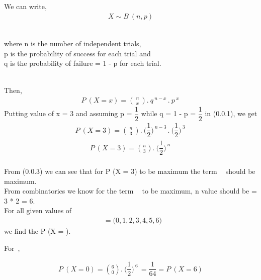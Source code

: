 \documentclass[journal,12pt,twocolumn]{IEEEtran}
\begin{document}
\subsection*{}\\
We can write,
\begin{align*}X \sim B\ (n, p)\end{align*}
\begin{flushalign}\\where n is the number of independent trials,\\ p is the probability of success for each trial and\\ q is the probability of failure = 1 - p for each trial.\end{flushalign}\\


Then, 
\begin{align}
P\ (X = x) = \binom{\ n\ }{\ x\ }.\ q^{\ n-x\ }.\ p^{\ x\ }
\end{align}
Putting value of x = 3 and assuming p = $\dfrac{1}{2}$ while q = 1 - p = $\dfrac{1}{2}$ in (0.0.1), we get\\
\begin{align}
P\ (X = 3) = \binom{\ n\ }{\ 3\ }.\ \Big(\dfrac{1}{2}\Big)^{\ n-3\ }.\ \Big({\dfrac{1}{2}}\Big)^{\ 3\ }
\end{align}
\begin{align}
P\ (X = 3) = \binom{n}{3}.\ \Big(\dfrac{1}{2}\Big)^{\ n\ }
\end{align}\\

From (0.0.3) we can see that for P (X = 3) to be maximum the term $\mathop{\binom{\ n\ }{\ 3\ }}$ should be maximum. \\

From combinatorics we know for the term $\mathop{\binom{\ n\ }{\ 3\ }}$ to be maximum, n value should be  = 3 * 2 = 6.\\

For all given values of \begin{align*}\mathop{x_i} = \Big( 0, 1, 2, 3, 4, 5, 6 \Big)\end{align*} we find the P (X = ).\\

\begin{flushleft}For\ ,\end{flushleft}
\begin{align}P\ (X = 0) = \binom{6}{0}.\ \Big(\dfrac{1}{2}\Big)^{\ 6\ } = \dfrac{1}{64} = P\ (X = 6)\end{align}\\
\end{document}
